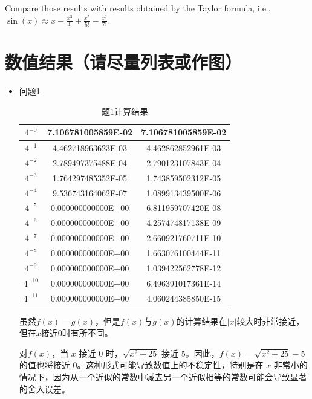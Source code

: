 \documentclass[UTF8]{ctexart}
\begin{document}
\begin{itemize}
\vspace{-0.2in}
Compare those results with results obtained by the Taylor formula, i.e., $\sin(x) \approx x- \frac{x^3}{3!} +  \frac{x^5}{5!} - \frac{x^7}{7!}$.
\end{itemize}

\clearpage

\section{数值结果（请尽量列表或作图）}
\begin{itemize}
  \item 问题1
\begin{table}[htb]
\begin{center}
\begin{tabular}{|c|c|c|} %
\hline
$4^{-0}$ & 7.106781005859E-02 & 7.106781005859E-02 \\
\hline
$4^{-1}$ & 4.462718963623E-03 & 4.462862852961E-03 \\
\hline
$4^{-2}$ & 2.789497375488E-04 & 2.790123107843E-04 \\
\hline
$4^{-3}$ & 1.764297485352E-05 & 1.743859502312E-05 \\
\hline
$4^{-4}$ & 9.536743164062E-07 & 1.089913439500E-06 \\
\hline
$4^{-5}$ & 0.000000000000E+00 & 6.811959707420E-08 \\
\hline
$4^{-6}$ & 0.000000000000E+00 & 4.257474817138E-09 \\
\hline
$4^{-7}$ & 0.000000000000E+00 & 2.660921760711E-10 \\
\hline
$4^{-8}$ & 0.000000000000E+00 & 1.663076100444E-11 \\
\hline
$4^{-9}$ & 0.000000000000E+00 & 1.039422562778E-12 \\
\hline
$4^{-10}$ & 0.000000000000E+00 & 6.496391017361E-14 \\
\hline
$4^{-11}$ & 0.000000000000E+00 & 4.060244385850E-15 \\
\hline
\end{tabular}
\end{center}
\caption{题1计算结果}
\end{table}


虽然\(f(x)=g(x)\)，但是\(f(x)\)与\(g(x)\)的计算结果在\(|x|\)较大时非常接近，但在\(x\)接近0时有所不同。

对\(f(x)\)，当 \( x \) 接近 0 时，\( \sqrt{x^2 + 25} \) 接近 5。因此，\( f(x) = \sqrt{x^2 + 25} - 5 \) 的值也将接近 0。这种形式可能导致数值上的不稳定性，特别是在 \( x \) 非常小的情况下，因为从一个近似的常数中减去另一个近似相等的常数可能会导致显著的舍入误差。


\end{itemize}
\end{document}
